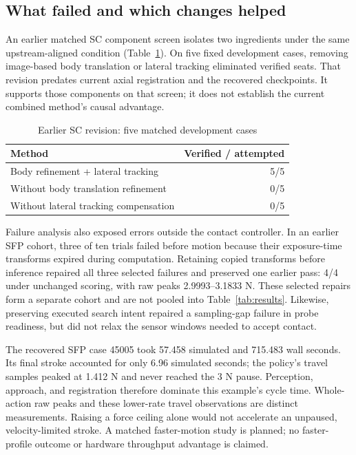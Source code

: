 \documentclass[letterpaper,10pt,conference]{ieeeconf}
\begin{document}
\subsection{What failed and which changes helped}
An earlier matched SC component screen isolates two ingredients under the
same upstream-aligned condition (Table~\ref{tab:ablation}). On five fixed
development cases, removing image-based body translation or lateral tracking
eliminated verified seats. That revision predates current axial registration
and the recovered checkpoints. It supports those components on that screen;
it does not establish the current combined method's causal advantage.

\begin{table}[t]
\caption{Earlier SC revision: five matched development cases}
\label{tab:ablation}
\centering\small
\begin{tabular}{@{}lr@{}}\toprule
Method&Verified / attempted\\\midrule
Body refinement + lateral tracking&5/5\\
Without body translation refinement&0/5\\
Without lateral tracking compensation&0/5\\\bottomrule
\end{tabular}
\end{table}

Failure analysis also exposed errors outside the contact controller. In an
earlier SFP cohort, three of ten trials failed before motion because their
exposure-time transforms expired during computation. Retaining copied
transforms before inference repaired all three selected failures and preserved
one earlier pass: 4/4 under unchanged scoring, with raw peaks 2.9993--3.1833 N.
These selected repairs form a separate cohort and are not pooled into
Table~\ref{tab:results}. Likewise, preserving executed search intent repaired
a sampling-gap failure in probe readiness, but did not relax the sensor
windows needed to accept contact.

The recovered SFP case 45005 took 57.458 simulated and 715.483 wall seconds.
Its final stroke accounted for only 6.96 simulated seconds; the policy's
travel samples peaked at 1.412 N and never reached the 3 N pause. Perception,
approach, and registration therefore dominate this example's cycle time.
Whole-action raw peaks and these lower-rate travel observations are distinct
measurements. Raising a force ceiling alone would not accelerate an
unpaused, velocity-limited stroke. A matched faster-motion study is planned;
no faster-profile outcome or hardware throughput advantage is claimed.
\end{document}
